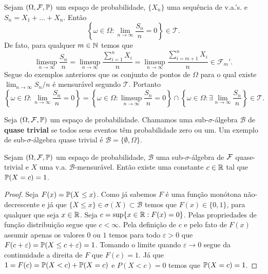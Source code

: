 \begin{exemplo}
	Sejam $(\Omega,\F,\P)$ um espaço de probabilidade,
	$\{X_n\}$ uma sequência de v.a.'s. e $S_n=X_1+\ldots+X_n$.
	Então 
	\[
		\left\{
			\omega\in \Omega: 
			\lim_{n\to\infty} \frac{S_n}{n}=0
		\right\}
		\in
		\mathcal{T}.
	\]
	De fato, para qualquer $m\in\N$ temos que
		\[
			\limsup_{n\to\infty} \frac{S_n}{n}
			=
			\limsup_{n\to\infty} \frac{\sum_{i=1}^n X_i}{n}
			=
			\limsup_{n\to\infty} \frac{\sum_{i=m+1}^n X_i}{n}
			\in
			\mathcal{F}_{m}'.
		\]
	Segue do exemplos anteriores que os conjunto de pontos 
	de $\Omega$ para o qual existe $\lim_{n\to\infty} S_n/n$ 
	é mensurável segundo $\mathcal{T}$. Portanto
	\[
		\left\{
			\omega\in \Omega: 
			\lim_{n\to\infty} \frac{S_n}{n}=0
		\right\}
		=
		\left\{
			\omega\in \Omega: 
			\limsup_{n\to\infty} \frac{S_n}{n}=0
		\right\}
		\cap
		\left\{
			\omega\in \Omega: 
			\exists \lim_{n\to\infty} \frac{S_n}{n}
		\right\}
		\in
		\mathcal{T}.
	\]
\end{exemplo}





Seja $(\Omega,\F,\P)$ um espaço de probabilidade.
Chamamos uma sub-$\sigma$-álgebra $\mathcal{B}$ de
{\bf quase trivial} se todos seus eventos têm probabilidade
zero ou um. Um exemplo de sub-$\sigma$-álgebra 
quase trivial é $\mathcal{B}=\{\emptyset,\Omega\}$.




\begin{lema}
\label{lema-sigma-algebras-quase-triviais}
Sejam $(\Omega,\F,\P)$ um espaço de probabilidade,
$\mathcal{B}$ uma sub-$\sigma$-álgebra de $\F$
quase-trivial e $X$ uma v.a. $\mathcal{B}$-mensurável.
Então existe uma constante $c\in\R$ tal que 
$\P(X=c)=1$.
\end{lema}



\begin{proof}
Seja $F(x)=\P(X\leq x)$. Como já sabemos $F$ é uma 
função monótona não-decrescente e já que 
$\{X\leq x\}\in\sigma(X)\subset \mathcal{B}$ 
temos que $F(x)\in\{0,1\}$, para qualquer 
que seja $x\in\R$. Seja $c =\sup\{x\in\R: F(x)=0\}$.
Pelas propriedades de função distribuição segue que 
$c<\infty$. Pela definição de $c$ e pelo fato de 
$F(x)$ assumir apenas os valores $0$ ou $1$
temos para todo $\varepsilon>0$ que
$F(c+\varepsilon)=\P(X\leq c+\varepsilon)=1$.
Tomando o limite quando $\varepsilon\to 0$ segue da 
continuidade a direita de $F$ que $F(c)=1$.
Já que $1=F(c)= \P(X<c)+\P(X=c)$ e $P(X<c)=0$
temos que $\P(X=c)=1$.
\end{proof}















